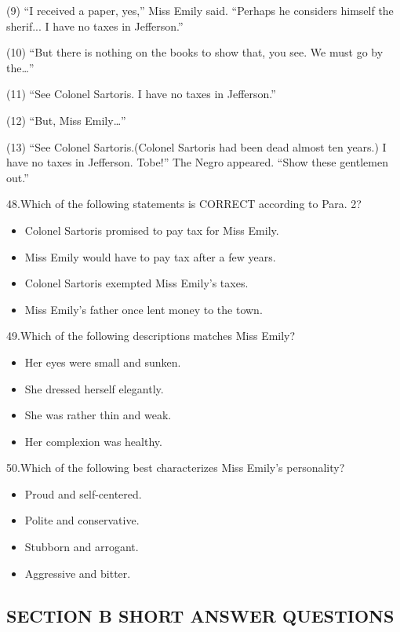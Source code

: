 \documentclass[UTF8,11pt]{ctexart}
\begin{document}
(9) “I received a paper, yes,” Miss Emily said. “Perhaps he considers himself the sherif... I have no taxes in Jefferson.”


(10) “But there is nothing on the books to show that, you see. We must go by the…”


(11) “See Colonel Sartoris. I have no taxes in Jefferson.”


(12) “But, Miss Emily…”


(13) “See Colonel Sartoris.(Colonel Sartoris had been dead almost ten years.) I have no taxes in Jefferson. Tobe!” The Negro appeared. “Show these gentlemen out.”


48.Which of the following statements is CORRECT according to Para. 2?


\begin{itemize}[leftmargin=2em,itemsep=.2em,topsep=.4em]\item[A.] Colonel Sartoris promised to pay tax for Miss Emily.
\item[B.] Miss Emily would have to pay tax after a few years.
\item[C.] Colonel Sartoris exempted Miss Emily’s taxes.
\item[D.] Miss Emily’s father once lent money to the town.
\end{itemize}

49.Which of the following descriptions matches Miss Emily?


\begin{itemize}[leftmargin=2em,itemsep=.2em,topsep=.4em]\item[A.] Her eyes were small and sunken.
\item[B.] She dressed herself elegantly.
\item[C.] She was rather thin and weak.
\item[D.] Her complexion was healthy.
\end{itemize}

50.Which of the following best characterizes Miss Emily’s personality?


\begin{itemize}[leftmargin=2em,itemsep=.2em,topsep=.4em]\item[A.] Proud and self-centered.
\item[B.] Polite and conservative.
\item[C.] Stubborn and arrogant.
\item[D.] Aggressive and bitter.
\end{itemize}

\subsection*{\textbf{SECTION B SHORT ANSWER QUESTIONS}}
\end{document}
